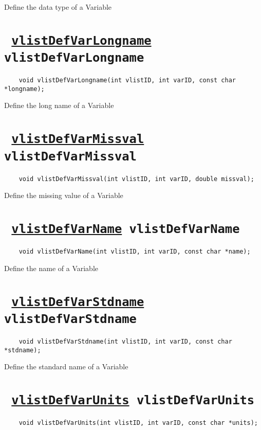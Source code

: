 Define the data type of a Variable
\ifpdfoutput{}{(\ref{vlistDefVarDatatype})}


\section*{\tt 
\ifpdf
\hyperref[vlistDefVarLongname]{vlistDefVarLongname}
\else
vlistDefVarLongname
\fi
}
\begin{verbatim}
    void vlistDefVarLongname(int vlistID, int varID, const char *longname);
\end{verbatim}

Define the long name of a Variable
\ifpdfoutput{}{(\ref{vlistDefVarLongname})}


\section*{\tt 
\ifpdf
\hyperref[vlistDefVarMissval]{vlistDefVarMissval}
\else
vlistDefVarMissval
\fi
}
\begin{verbatim}
    void vlistDefVarMissval(int vlistID, int varID, double missval);
\end{verbatim}

Define the missing value of a Variable
\ifpdfoutput{}{(\ref{vlistDefVarMissval})}


\section*{\tt 
\ifpdf
\hyperref[vlistDefVarName]{vlistDefVarName}
\else
vlistDefVarName
\fi
}
\begin{verbatim}
    void vlistDefVarName(int vlistID, int varID, const char *name);
\end{verbatim}

Define the name of a Variable
\ifpdfoutput{}{(\ref{vlistDefVarName})}


\section*{\tt 
\ifpdf
\hyperref[vlistDefVarStdname]{vlistDefVarStdname}
\else
vlistDefVarStdname
\fi
}
\begin{verbatim}
    void vlistDefVarStdname(int vlistID, int varID, const char *stdname);
\end{verbatim}

Define the standard name of a Variable
\ifpdfoutput{}{(\ref{vlistDefVarStdname})}


\section*{\tt 
\ifpdf
\hyperref[vlistDefVarUnits]{vlistDefVarUnits}
\else
vlistDefVarUnits
\fi
}
\begin{verbatim}
    void vlistDefVarUnits(int vlistID, int varID, const char *units);
\end{verbatim}

